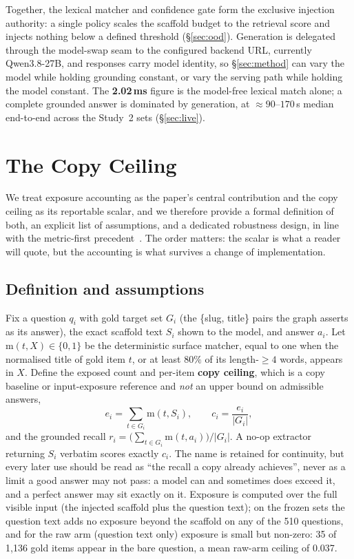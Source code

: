 \documentclass[10pt,twocolumn]{article}
\begin{document}
Together, the lexical matcher and confidence gate form the exclusive injection authority: a single policy scales the scaffold budget to the retrieval score and injects nothing below a defined threshold (\S\ref{sec:ood}). Generation is delegated through the model-swap seam to the configured backend URL, currently Qwen3.8-27B, and responses carry model identity, so \S\ref{sec:method} can vary the model while holding grounding constant, or vary the serving path while holding the model constant. The \textbf{2.02\,ms} figure is the model-free lexical match alone; a complete grounded answer is dominated by generation, at $\approx90$--$170$\,s median end-to-end across the Study~2 sets (\S\ref{sec:live}).

\section{The Copy Ceiling}\label{sec:ceiling}
We treat exposure accounting as the paper's central contribution and the copy ceiling as its reportable scalar, and we therefore provide a formal definition of both, an explicit list of assumptions, and a dedicated robustness design, in line with the metric-first precedent~\cite{min2023factscore,gao2023alce}. The order matters: the scalar is what a reader will quote, but the accounting is what survives a change of implementation.

\subsection{Definition and assumptions}
Fix a question $q_i$ with gold target set $G_i$ (the \{slug, title\} pairs the graph asserts as its answer), the exact scaffold text $S_i$ shown to the model, and answer $a_i$. Let $\mathrm{m}(t,X)\in\{0,1\}$ be the deterministic surface matcher, equal to one when the normalised title of gold item $t$, or at least $80\%$ of its length-$\geq4$ words, appears in $X$. Define the exposed count and per-item \textbf{copy ceiling}, which is a copy baseline or input-exposure reference and \emph{not} an upper bound on admissible answers,
\[
  e_i=\sum_{t\in G_i}\mathrm{m}(t,S_i),\qquad
  c_i=\frac{e_i}{|G_i|},
\]
and the grounded recall $r_i=\bigl(\sum_{t\in G_i}\mathrm{m}(t,a_i)\bigr)/|G_i|$. A no-op extractor returning $S_i$ verbatim scores exactly $c_i$. The name is retained for continuity, but every later use should be read as ``the recall a copy already achieves'', never as a limit a good answer may not pass: a model can and sometimes does exceed it, and a perfect answer may sit exactly on it. Exposure is computed over the full visible input (the injected scaffold plus the question text); on the frozen sets the question text adds no exposure beyond the scaffold on any of the 510 questions, and for the raw arm (question text only) exposure is small but non-zero: 35 of 1{,}136 gold items appear in the bare question, a mean raw-arm ceiling of 0.037.
\end{document}
